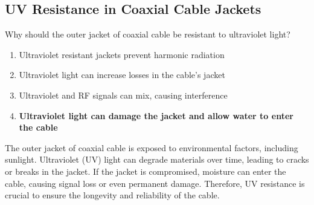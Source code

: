 \subsection{UV Resistance in Coaxial Cable Jackets}
\label{T7C10}

\begin{tcolorbox}[colback=gray!10!white,colframe=black!75!black,title=T7C10]
Why should the outer jacket of coaxial cable be resistant to ultraviolet light?
\begin{enumerate}[noitemsep]
    \item Ultraviolet resistant jackets prevent harmonic radiation
    \item Ultraviolet light can increase losses in the cable’s jacket
    \item Ultraviolet and RF signals can mix, causing interference
    \item \textbf{Ultraviolet light can damage the jacket and allow water to enter the cable}
\end{enumerate}
\end{tcolorbox}

The outer jacket of coaxial cable is exposed to environmental factors, including sunlight. Ultraviolet (UV) light can degrade materials over time, leading to cracks or breaks in the jacket. If the jacket is compromised, moisture can enter the cable, causing signal loss or even permanent damage. Therefore, UV resistance is crucial to ensure the longevity and reliability of the cable.